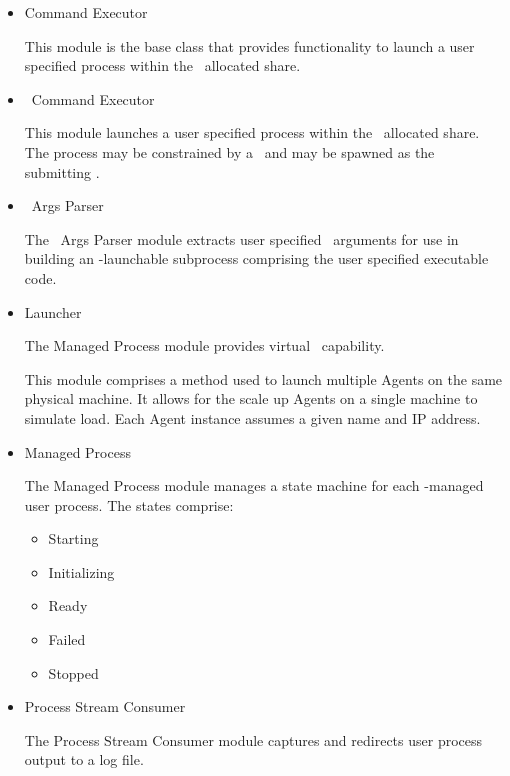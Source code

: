 \begin{itemize}
\begin{itemize}
      \item Command Executor
      
      This module is the base class that provides functionality to
      launch a user specified process within the 
      \varResourceManager~allocated share. 
      
      \item \varDUCC~Command Executor
      
      This module launches a user specified process within the 
      \varResourceManager~allocated share. 
      The process may be constrained by a \varLinuxControlGroup~and
      may be spawned as the submitting \varUser.
      
      \item \varJVM~Args Parser
      
      The \varJVM~Args Parser module extracts user specified \varJVM~arguments
      for use in building an \varAgent-launchable subprocess comprising
      the user specified executable code.
      
      \item Launcher
      
      The Managed Process module provides virtual \varAgent~capability.
      
      This module comprises a method used to launch multiple Agents
      on the same physical machine. 
      It allows for the scale up Agents on a single machine to simulate load.
      Each Agent instance assumes a given name and IP address.
      
      \item Managed Process

      The Managed Process module manages a state machine for each
      \varAgent-managed user process.  The states comprise:
      
         \begin{itemize}
           \item Starting
           \item Initializing
           \item Ready
           \item Failed
           \item Stopped
         \end{itemize}
         
      \item Process Stream Consumer
      
      The Process Stream Consumer module captures and redirects user process output
      to a log file.
      

\end{itemize}
\end{itemize}
